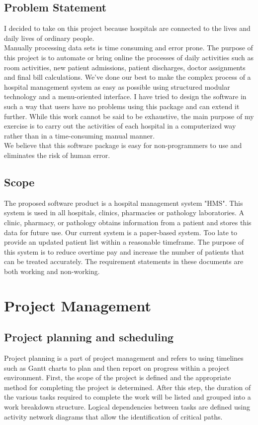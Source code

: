 \documentclass{article}
\begin{document}
\subsection{Problem Statement }
I decided to take on this project because hospitals are connected to the lives and daily lives of ordinary people.\\
Manually processing data sets is time consuming and error prone. The purpose of this project is to automate or bring online the processes of daily activities such as room activities, new patient admissions, patient discharges, doctor assignments and final bill calculations. We've done our best to make the complex process of a hospital management system as easy as possible using structured modular technology and a menu-oriented interface. I have tried to design the software in such a way that users have no problems using this package and can extend it further. While this work cannot be said to be exhaustive, the main purpose of my exercise is to carry out the activities of each hospital in a computerized way rather than in a time-consuming manual manner.\\
We believe that this software package is easy for non-programmers to use and eliminates the risk of human error. 
\newpage
\subsection{Scope}
The proposed software product is a hospital management system "HMS". This system is used in all hospitals, clinics, pharmacies or pathology laboratories. A clinic, pharmacy, or pathology obtains information from a patient and stores this data for future use. Our current system is a paper-based system. Too late to provide an updated patient list within a reasonable timeframe. The purpose of this system is to reduce overtime pay and increase the number of patients that can be treated accurately. The requirement statements in these documents are both working and non-working.
\newpage
\section{Project Management}
\subsection{Project planning and scheduling}
Project planning is a part of project management and refers to using timelines such as Gantt charts to plan and then report on progress within a project environment. First, the scope of the project is defined and the appropriate method for completing the project is determined. After this step, the duration of the various tasks required to complete the work will be listed and grouped into a work breakdown structure. Logical dependencies between tasks are defined using activity network diagrams that allow the identification of critical paths. 
\newpage
\end{document}
